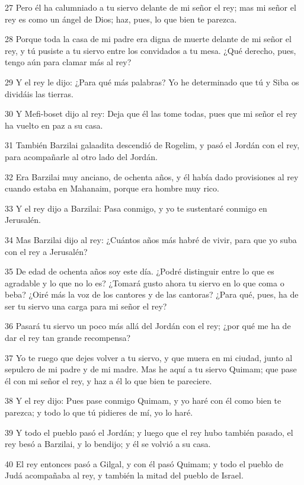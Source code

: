 \par 27 Pero él ha calumniado a tu siervo delante de mi señor el rey; mas mi señor el rey es como un ángel de Dios; haz, pues, lo que bien te parezca.
\par 28 Porque toda la casa de mi padre era digna de muerte delante de mi señor el rey, y tú pusiste a tu siervo entre los convidados a tu mesa. ¿Qué derecho, pues, tengo aún para clamar más al rey?
\par 29 Y el rey le dijo: ¿Para qué más palabras? Yo he determinado que tú y Siba os dividáis las tierras.
\par 30 Y Mefi-boset dijo al rey: Deja que él las tome todas, pues que mi señor el rey ha vuelto en paz a su casa.
\par 31 También Barzilai galaadita descendió de Rogelim, y pasó el Jordán con el rey, para acompañarle al otro lado del Jordán.
\par 32 Era Barzilai muy anciano, de ochenta años, y él había dado provisiones al rey cuando estaba en Mahanaim, porque era hombre muy rico.
\par 33 Y el rey dijo a Barzilai: Pasa conmigo, y yo te sustentaré conmigo en Jerusalén.
\par 34 Mas Barzilai dijo al rey: ¿Cuántos años más habré de vivir, para que yo suba con el rey a Jerusalén?
\par 35 De edad de ochenta años soy este día. ¿Podré distinguir entre lo que es agradable y lo que no lo es? ¿Tomará gusto ahora tu siervo en lo que coma o beba? ¿Oiré más la voz de los cantores y de las cantoras? ¿Para qué, pues, ha de ser tu siervo una carga para mi señor el rey?
\par 36 Pasará tu siervo un poco más allá del Jordán con el rey; ¿por qué me ha de dar el rey tan grande recompensa?
\par 37 Yo te ruego que dejes volver a tu siervo, y que muera en mi ciudad, junto al sepulcro de mi padre y de mi madre. Mas he aquí a tu siervo Quimam; que pase él con mi señor el rey, y haz a él lo que bien te pareciere.
\par 38 Y el rey dijo: Pues pase conmigo Quimam, y yo haré con él como bien te parezca; y todo lo que tú pidieres de mí, yo lo haré.
\par 39 Y todo el pueblo pasó el Jordán; y luego que el rey hubo también pasado, el rey besó a Barzilai, y lo bendijo; y él se volvió a su casa.
\par 40 El rey entonces pasó a Gilgal, y con él pasó Quimam; y todo el pueblo de Judá acompañaba al rey, y también la mitad del pueblo de Israel.
